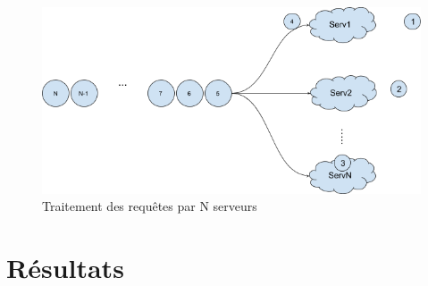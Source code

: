 \documentclass[12pt,a4paper]{article}
\begin{document}
    \begin{figure}[H]
        \includegraphics[scale=0.6]{servers.png}
        \caption{Traitement des requêtes par N serveurs}
    \end{figure}
    
        \newpage
    \section{Résultats}
    \par 
    
\end{document}
